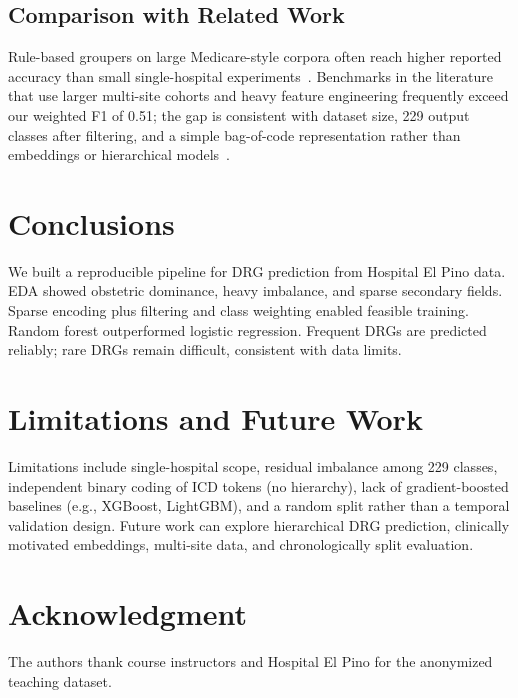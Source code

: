 \documentclass{ieeeaccess}
\begin{document}
\subsection{Comparison with Related Work}
Rule-based groupers on large Medicare-style corpora often reach higher reported accuracy than small single-hospital experiments~\cite{goldfield2008}. Benchmarks in the literature that use larger multi-site cohorts and heavy feature engineering frequently exceed our weighted F1 of 0.51; the gap is consistent with dataset size, 229 output classes after filtering, and a simple bag-of-code representation rather than embeddings or hierarchical models~\cite{mullenbach2018}.

\section{Conclusions}
\label{sec:conc}
We built a reproducible pipeline for DRG prediction from Hospital El Pino data. EDA showed obstetric dominance, heavy imbalance, and sparse secondary fields. Sparse encoding plus filtering and class weighting enabled feasible training. Random forest outperformed logistic regression. Frequent DRGs are predicted reliably; rare DRGs remain difficult, consistent with data limits.

\section{Limitations and Future Work}
\label{sec:lim}
Limitations include single-hospital scope, residual imbalance among 229 classes, independent binary coding of ICD tokens (no hierarchy), lack of gradient-boosted baselines (e.g., XGBoost, LightGBM), and a random split rather than a temporal validation design. Future work can explore hierarchical DRG prediction, clinically motivated embeddings, multi-site data, and chronologically split evaluation.

\section*{Acknowledgment}
The authors thank course instructors and Hospital El Pino for the anonymized teaching dataset.
\end{document}
